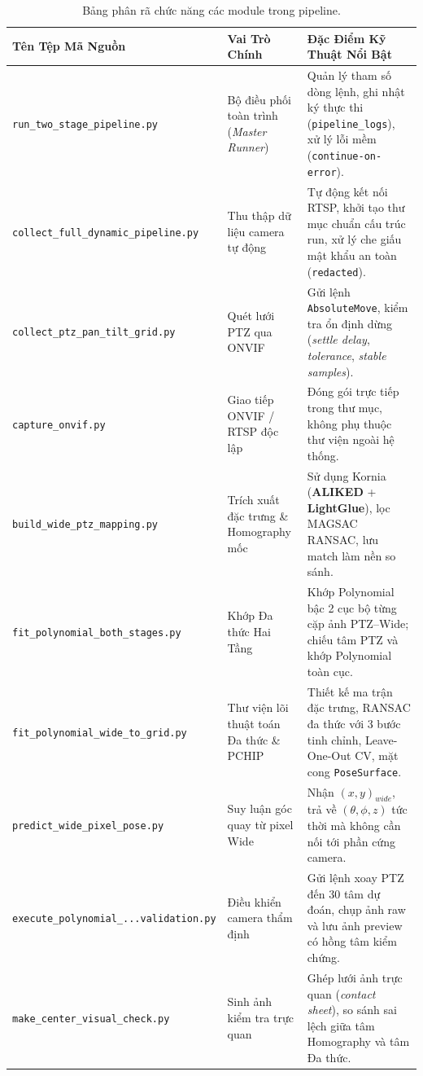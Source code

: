 \documentclass[11pt,a4paper]{article}
\begin{document}
\begin{table}[htbp]
\centering
\small
\renewcommand{\arraystretch}{1.3}
\begin{tabularx}{\textwidth}{l p{5.5cm} X}
\toprule
\textbf{Tên Tệp Mã Nguồn} & \textbf{Vai Trò Chính} & \textbf{Đặc Điểm Kỹ Thuật Nổi Bật} \\
\midrule
\texttt{run\_two\_stage\_pipeline.py} & Bộ điều phối toàn trình (\textit{Master Runner}) & Quản lý tham số dòng lệnh, ghi nhật ký thực thi (\texttt{pipeline\_logs}), xử lý lỗi mềm (\texttt{continue-on-error}). \\
\texttt{collect\_full\_dynamic\_pipeline.py} & Thu thập dữ liệu camera tự động & Tự động kết nối RTSP, khởi tạo thư mục chuẩn cấu trúc run, xử lý che giấu mật khẩu an toàn (\texttt{redacted}). \\
\texttt{collect\_ptz\_pan\_tilt_grid.py} & Quét lưới PTZ qua ONVIF & Gửi lệnh \texttt{AbsoluteMove}, kiểm tra ổn định dừng (\textit{settle delay}, \textit{tolerance}, \textit{stable samples}). \\
\texttt{capture\_onvif.py} & Giao tiếp ONVIF / RTSP độc lập & Đóng gói trực tiếp trong thư mục, không phụ thuộc thư viện ngoài hệ thống. \\
\texttt{build\_wide\_ptz\_mapping.py} & Trích xuất đặc trưng \& Homography mốc & Sử dụng Kornia (\textbf{ALIKED} + \textbf{LightGlue}), lọc MAGSAC RANSAC, lưu match làm nền so sánh. \\
\texttt{fit\_polynomial\_both\_stages.py} & Khớp Đa thức Hai Tầng & Khớp Polynomial bậc 2 cục bộ từng cặp ảnh PTZ--Wide; chiếu tâm PTZ và khớp Polynomial toàn cục. \\
\texttt{fit\_polynomial\_wide\_to_grid.py} & Thư viện lõi thuật toán Đa thức \& PCHIP & Thiết kế ma trận đặc trưng, RANSAC đa thức với 3 bước tinh chỉnh, Leave-One-Out CV, mặt cong \texttt{PoseSurface}. \\
\texttt{predict\_wide_pixel_pose.py} & Suy luận góc quay từ pixel Wide & Nhận $(x, y)_{wide}$, trả về $(\theta, \phi, z)$ tức thời mà không cần nối tới phần cứng camera. \\
\texttt{execute\_polynomial\_...validation.py} & Điều khiển camera thẩm định & Gửi lệnh xoay PTZ đến 30 tâm dự đoán, chụp ảnh raw và lưu ảnh preview có hồng tâm kiểm chứng. \\
\texttt{make_center_visual_check.py} & Sinh ảnh kiểm tra trực quan & Ghép lưới ảnh trực quan (\textit{contact sheet}), so sánh sai lệch giữa tâm Homography và tâm Đa thức. \\
\bottomrule
\end{tabularx}
\caption{Bảng phân rã chức năng các module trong pipeline.}
\label{tab:file_responsibility}
\end{table}
\end{document}
